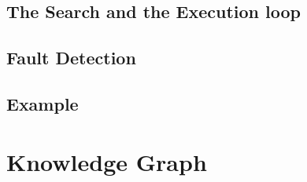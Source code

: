 \subsection{The Search and the Execution loop}
\label{subsec:2_loops}
\subsection{Fault Detection}
\label{subsec:fault_detection}
\subsection{Example}
\label{subsec:hgraph_example}

\section{Knowledge Graph}
\label{sec:kgraph}

